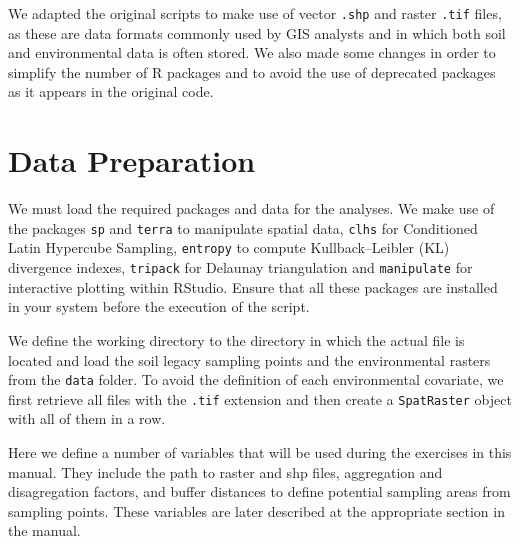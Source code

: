 \documentclass[
  10pt,
  b5paper,
  oneside]{book}
\newenvironment{Shaded}{\begin{snugshade}}{\end{snugshade}}
\newcommand{\DocumentationTok}[1]{\textcolor[rgb]{0.56,0.35,0.01}{\textbf{\textit{#1}}}}
\newcommand{\FunctionTok}[1]{\textcolor[rgb]{0.00,0.00,0.00}{#1}}
\newcommand{\NormalTok}[1]{#1}
\newcommand{\SpecialCharTok}[1]{\textcolor[rgb]{0.00,0.00,0.00}{#1}}
\begin{document}
We adapted the original scripts to make use of vector \texttt{\textquotesingle{}.shp\textquotesingle{}} and raster \texttt{\textquotesingle{}.tif\textquotesingle{}} files, as these are data formats commonly used by GIS analysts and in which both soil and environmental data is often stored. We also made some changes in order to simplify the number of R packages and to avoid the use of deprecated packages as it appears in the original code.

\hypertarget{data-preparation}{%
\section{Data Preparation}\label{data-preparation}}

We must load the required packages and data for the analyses. We make use of the packages \texttt{sp} and \texttt{terra} to manipulate spatial data, \texttt{clhs} for Conditioned Latin Hypercube Sampling, \texttt{entropy} to compute Kullback--Leibler (KL) divergence indexes, \texttt{tripack} for Delaunay triangulation and \texttt{manipulate} for interactive plotting within RStudio. Ensure that all these packages are installed in your system before the execution of the script.

We define the working directory to the directory in which the actual file is located and load the soil legacy sampling points and the environmental rasters from the \texttt{data} folder. To avoid the definition of each environmental covariate, we first retrieve all files with the \texttt{.tif} extension and then create a \texttt{SpatRaster} object with all of them in a row.

\begin{Shaded}
\end{Shaded}

Here we define a number of variables that will be used during the exercises in this manual. They include the path to raster and shp files, aggregation and disagregation factors, and buffer distances to define potential sampling areas from sampling points. These variables are later described at the appropriate section in the manual.
\end{document}
